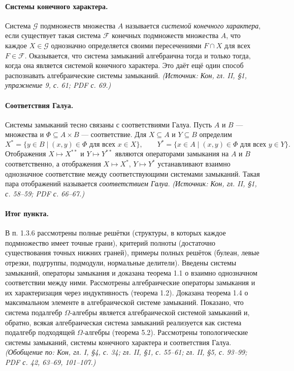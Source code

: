 \documentclass[a4paper,12pt]{article}
\begin{document}
\paragraph{Системы конечного характера.}
Система \(\mathcal{G}\) подмножеств множества \(A\) называется \emph{системой конечного характера}, если существует такая система \(\mathcal{F}\) конечных подмножеств множества \(A\), что каждое \(X\in\mathcal{G}\) однозначно определяется своими пересечениями \(F\cap X\) для всех \(F\in\mathcal{F}\). Оказывается, что система замыканий алгебраична тогда и только тогда, когда она является системой конечного характера. Это даёт ещё один способ распознавать алгебраические системы замыканий.
\textit{(Источник: Кон, гл. II, §1, упражнение 9, с. 61; PDF с. 69.)}

\paragraph{Соответствия Галуа.}
Системы замыканий тесно связаны с соответствиями Галуа. Пусть \(A\) и \(B\) — множества и \(\Phi\subseteq A\times B\) — соответствие. Для \(X\subseteq A\) и \(Y\subseteq B\) определим
\[
X^*=\{y\in B\mid (x,y)\in\Phi\text{ для всех }x\in X\},
\qquad
Y^*=\{x\in A\mid (x,y)\in\Phi\text{ для всех }y\in Y\}.
\]
Отображения \(X\mapsto X^{**}\) и \(Y\mapsto Y^{**}\) являются операторами замыкания на \(A\) и \(B\) соответственно, а отображения \(X\mapsto X^*\), \(Y\mapsto Y^*\) устанавливают взаимно однозначное соответствие между соответствующими системами замыканий. Такая пара отображений называется \emph{соответствием Галуа}.
\textit{(Источник: Кон, гл. II, §1, с. 58--59; PDF с. 66--67.)}

\paragraph{Итог пункта.}
В п. 1.3.6 рассмотрены полные решётки (структуры, в которых каждое подмножество имеет точные грани), критерий полноты (достаточно существования точных нижних граней), примеры полных решёток (булеан, левые отрезки, подгруппы, подмодули, нормальные делители). Введены системы замыканий, операторы замыкания и доказана теорема 1.1 о взаимно однозначном соответствии между ними. Рассмотрены алгебраические операторы замыкания и их характеризация через индуктивность (теорема 1.2). Доказана теорема 1.4 о максимальном элементе в алгебраической системе замыканий. Показано, что система подалгебр \(\Omega\)-алгебры является алгебраической системой замыканий и, обратно, всякая алгебраическая система замыканий реализуется как система подалгебр подходящей \(\Omega\)-алгебры (теорема 5.2). Рассмотрены топологические системы замыканий, системы конечного характера и соответствия Галуа.
\textit{(Обобщение по: Кон, гл. I, §4, с. 34; гл. II, §1, с. 55--61; гл. II, §5, с. 93--99; PDF с. 42, 63--69, 101--107.)}
\end{document}
